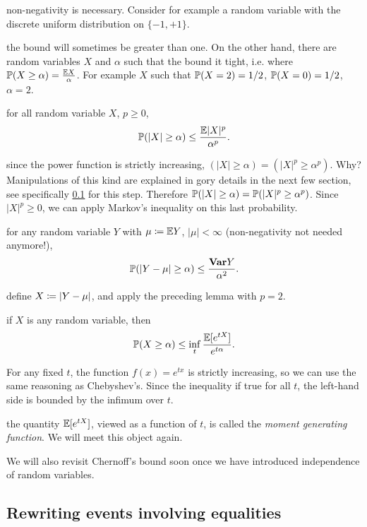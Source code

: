\documentclass{article}
\begin{document}
 non-negativity is necessary. Consider for example a random variable with the discrete uniform distribution on $\{-1, +1\}$. 

 the bound will sometimes be greater than one. On the other hand, there are random variables $X$ and $\alpha$ such that the bound it tight, i.e. where $\P( X \ge \alpha) = \frac{\E X}{\alpha}$. For example $X$ such that $\P(X = 2) = 1/2$, $\P(X = 0) = 1/2$, $\alpha = 2$.

 for all random variable $X$, $p \ge 0$,
\[ \P(|X| \ge \alpha) \le \frac{\E |X|^p}{\alpha^p}. \]

 since the power function is strictly increasing, $(|X| \ge \alpha) = (|X|^p \ge \alpha^p)$. Why? Manipulations of this kind are explained in gory details in the next few section, see specifically \ref{sec:rewriting-equalities} for this step. Therefore $\P(|X| \ge \alpha) = \P(|X|^p \ge \alpha^p)$. Since $|X|^p \ge 0$, we can apply Markov's inequality on this last probability.


 for any random variable $Y$ with $\mu \defeq \E Y$, $|\mu| < \infty$ (non-negativity not needed anymore!),
\[ \P(|Y - \mu| \ge \alpha) \le \frac{\var Y}{\alpha^2}. \]

 define $X \defeq |Y - \mu|$, and apply the preceding lemma with $p = 2$.

 if $X$ is any random variable, then
\[ \P(X \ge \alpha) \le \inf_t \frac{\E[e^{tX}]}{e^{t\alpha}}. \]

 For any fixed $t$, the function $f(x) = e^{tx}$ is strictly increasing, so we can use the same reasoning as Chebyshev's. Since the inequality if true for all $t$, the left-hand side is bounded by the infimum over $t$.

 the quantity $\E[e^{tX}]$, viewed as a function of $t$, is called the \emph{moment generating function}. We will meet this object again. 

We will also revisit Chernoff's bound soon once we have introduced independence of random variables. 


\subsection{Rewriting events involving equalities}\label{sec:rewriting-equalities}
\end{document}

